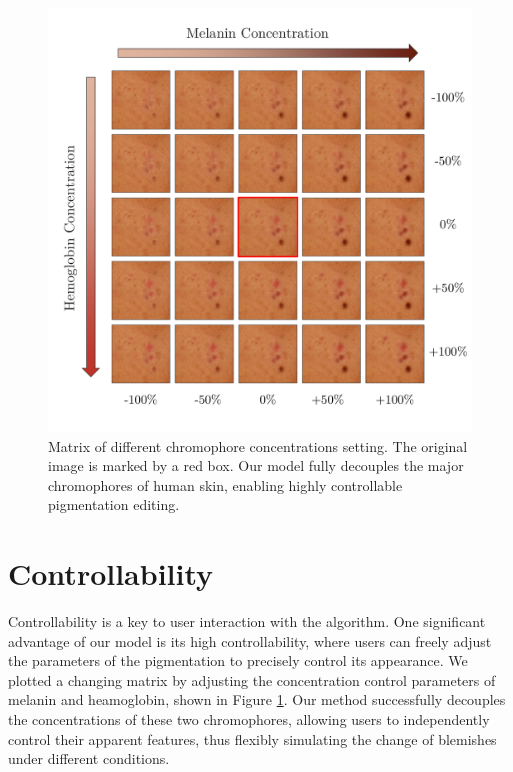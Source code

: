 \begin{spacing}{1.5}
\begin{figure}[t!]
    \centering
    \includegraphics[width=0.96\columnwidth]{Chapter5/grid.pdf}
    \caption{Matrix of different chromophore concentrations setting. The original image is marked by a red box. Our model fully decouples the major chromophores of human skin, enabling highly controllable pigmentation editing.}
    \label{fig:matrix}
\end{figure}

\section{Controllability}
Controllability is a key to user interaction with the algorithm. One significant advantage of our model is its high controllability, where users can freely adjust the parameters of the pigmentation to precisely control its appearance.
We plotted a changing matrix by adjusting the concentration control parameters of melanin and heamoglobin, shown in Figure \ref{fig:matrix}. Our method successfully decouples the concentrations of these two chromophores, allowing users to independently control their apparent features, thus flexibly simulating the change of blemishes under different conditions.


\end{spacing}
